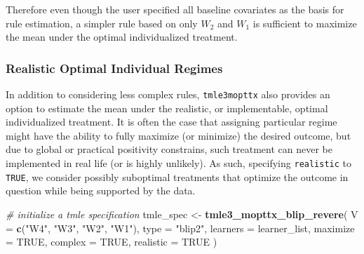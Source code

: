 \documentclass[12pt, krantz2,]{krantz}
\newenvironment{Shaded}{\begin{snugshade}}{\end{snugshade}}
\newcommand{\CommentTok}[1]{\textcolor[rgb]{0.37,0.37,0.37}{\textit{#1}}}
\newcommand{\DataTypeTok}[1]{\textcolor[rgb]{0.27,0.27,0.27}{#1}}
\newcommand{\DecValTok}[1]{\textcolor[rgb]{0.06,0.06,0.06}{#1}}
\newcommand{\FloatTok}[1]{\textcolor[rgb]{0.06,0.06,0.06}{#1}}
\newcommand{\KeywordTok}[1]{\textcolor[rgb]{0.27,0.27,0.27}{\textbf{#1}}}
\newcommand{\NormalTok}[1]{#1}
\newcommand{\OperatorTok}[1]{\textcolor[rgb]{0.43,0.43,0.43}{\textbf{#1}}}
\newcommand{\OtherTok}[1]{\textcolor[rgb]{0.37,0.37,0.37}{#1}}
\newcommand{\StringTok}[1]{\textcolor[rgb]{0.5,0.5,0.5}{#1}}
\theoremstyle{definition}
\theoremstyle{definition}
\theoremstyle{definition}
\newcommand{\1}{\mathbbm{1}}
\begin{document}
Therefore even though the user specified all baseline covariates as the basis
for rule estimation, a simpler rule based on only \(W_2\) and \(W_1\) is sufficient
to maximize the mean under the optimal individualized treatment.

\hypertarget{realistic-optimal-individual-regimes}{%
\subsubsection{Realistic Optimal Individual Regimes}\label{realistic-optimal-individual-regimes}}

In addition to considering less complex rules, \texttt{tmle3mopttx} also provides an
option to estimate the mean under the realistic, or implementable, optimal
individualized treatment. It is often the case that assigning particular regime
might have the ability to fully maximize (or minimize) the desired outcome, but
due to global or practical positivity constrains, such treatment can never be
implemented in real life (or is highly unlikely). As such, specifying
\texttt{realistic} to \texttt{TRUE}, we consider possibly suboptimal treatments that optimize
the outcome in question while being supported by the data.

\begin{Shaded}
\begin{Highlighting}[]
\CommentTok{# initialize a tmle specification}
\NormalTok{tmle_spec <-}\StringTok{ }\KeywordTok{tmle3_mopttx_blip_revere}\NormalTok{(}
  \DataTypeTok{V =} \KeywordTok{c}\NormalTok{(}\StringTok{"W4"}\NormalTok{, }\StringTok{"W3"}\NormalTok{, }\StringTok{"W2"}\NormalTok{, }\StringTok{"W1"}\NormalTok{), }\DataTypeTok{type =} \StringTok{"blip2"}\NormalTok{,}
  \DataTypeTok{learners =}\NormalTok{ learner_list,}
  \DataTypeTok{maximize =} \OtherTok{TRUE}\NormalTok{, }\DataTypeTok{complex =} \OtherTok{TRUE}\NormalTok{, }\DataTypeTok{realistic =} \OtherTok{TRUE}
\NormalTok{)}
\end{Highlighting}
\end{Shaded}

\begin{Shaded}
\end{Shaded}
\end{document}
